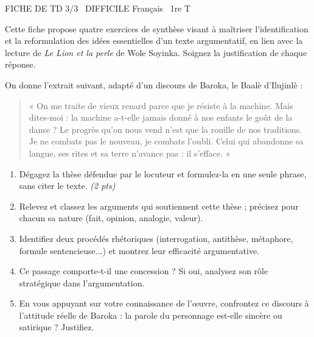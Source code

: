 \documentclass[11pt]{article}
\begin{document}
\begin{tcolorbox}[enhanced,colback=popink,colframe=popink,arc=10pt,boxrule=0pt,left=12pt,right=12pt,top=9pt,bottom=9pt]
{\color{white}\popxbold\small FICHE DE TD 3/3 \textbullet\ DIFFICILE \hfill Français \textbullet\ 1re T\par}
\end{tcolorbox}
\vspace{4pt}
Cette fiche propose quatre exercices de synthèse visant à maîtriser l'identification et la reformulation des idées essentielles d'un texte argumentatif, en lien avec la lecture de \emph{Le Lion et la perle} de Wole Soyinka. Soignez la justification de chaque réponse.

\begin{exercice}
On donne l'extrait suivant, adapté d'un discours de Baroka, le Baalè d'Ilujinlè :

\begin{quote}
« On me traite de vieux renard parce que je résiste à la machine. Mais dites-moi : la machine a-t-elle jamais donné à nos enfants le goût de la danse ? Le progrès qu'on nous vend n'est que la rouille de nos traditions. Je ne combats pas le nouveau, je combats l'oubli. Celui qui abandonne sa langue, ses rites et sa terre n'avance pas : il s'efface. »
\end{quote}

\begin{enumerate}
  \item Dégagez la thèse défendue par le locuteur et formulez-la en une seule phrase, sans citer le texte. \emph{(2 pts)}
  \item Relevez et classez les arguments qui soutiennent cette thèse ; précisez pour chacun sa nature (fait, opinion, analogie, valeur).
  \item Identifiez deux procédés rhétoriques (interrogation, antithèse, métaphore, formule sentencieuse...) et montrez leur efficacité argumentative.
  \item Ce passage comporte-t-il une concession ? Si oui, analysez son rôle stratégique dans l'argumentation.
  \item En vous appuyant sur votre connaissance de l'\oe uvre, confrontez ce discours à l'attitude réelle de Baroka : la parole du personnage est-elle sincère ou satirique ? Justifiez.
\end{enumerate}
\end{exercice}
\end{document}

